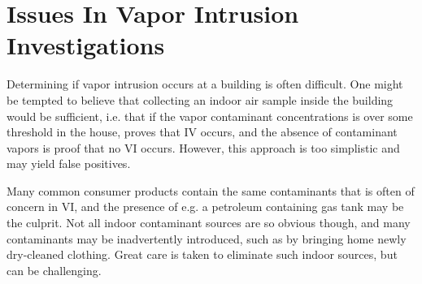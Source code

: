 \begin{comment}
Purpose is to demonstrate the issues that temporal and spatial variability causes in VI site investigations, and impress upon the reader the necessity to solve these.

- State the general issues, i.e. harder to assess real human exposure, more expensive, etc.
- Give examples in the literature and describe the situation. (1-2 examples for spatial/temporal respectively should suffice.)

Topics to cover:

Issues that confound VI investigations:
* Indoor sources/false positives (problem with only indoor samples)
* Sub-surface contaminant formation by indoor (sub-surface samples)
* Groundwater samples (spatial variability & presence of contaminants here does not mean entry occurs)
* Issues with preferential pathways
  * Indie style (long distance transport of contaminants)
  * Kelly style (plumbing fixtures)
  * ASU style (+ Danish study?) (nearby sub surface features that are not readily apparent)
* Seasonal aspect
* Necessity of MLE
  * Expensive and hard
  * Need for more robust methods

\end{comment}

\section{Issues In Vapor Intrusion Investigations}

Determining if vapor intrusion occurs at a building is often difficult.
One might be tempted to believe that collecting an indoor air sample inside the building would be sufficient, i.e. that if the vapor contaminant concentrations is over some threshold in the house, proves that IV occurs, and the absence of contaminant vapors is proof that no VI occurs.
However, this approach is too simplistic and may yield false positives.\par %

Many common consumer products contain the same contaminants that is often of concern in VI, and the presence of e.g. a petroleum containing gas tank may be the culprit.
Not all indoor contaminant sources are so obvious though, and many contaminants may be inadvertently introduced, such as by bringing home newly dry-cleaned clothing.
Great care is taken to eliminate such indoor sources, but can be challenging.\par %

